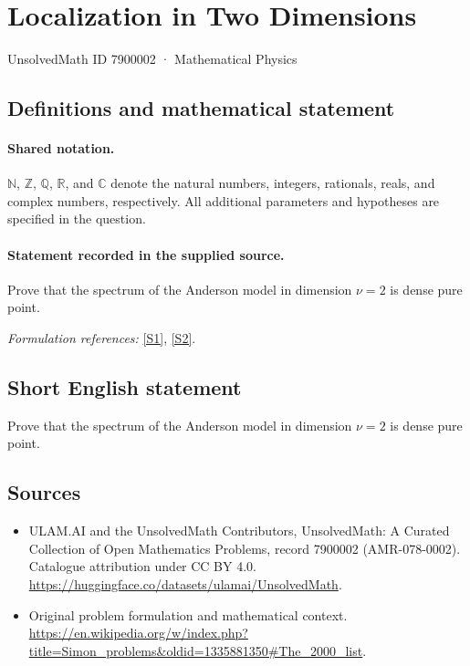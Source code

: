 \documentclass[11pt]{article}
\newcommand{\sref}[2]{\hyperlink{source:#1:#2}{[S#2]}}
\begin{document}
\setcounter{section}{7900001}
\section{Localization in Two Dimensions}\label{7900002}
{\small UnsolvedMath ID 7900002 · Mathematical Physics}
\subsection{Definitions and mathematical statement}

\paragraph{Shared notation.}$\mathbb N$, $\mathbb Z$, $\mathbb Q$, $\mathbb R$, and $\mathbb C$ denote the natural numbers, integers, rationals, reals, and complex numbers, respectively. All additional parameters and hypotheses are specified in the question.


\paragraph{Statement recorded in the supplied source.}
Prove that the spectrum of the Anderson model in dimension $\nu=2$ is dense pure point.
\par\smallskip\textit{Formulation references:} \sref{7900002}{1}, \sref{7900002}{2}.
\subsection{Short English statement}
Prove that the spectrum of the Anderson model in dimension $\nu=2$ is dense pure point.
\subsection{Sources}
\begin{itemize}
\item[\hypertarget{source:7900002:1}{S1}] ULAM.AI and the UnsolvedMath Contributors, UnsolvedMath: A Curated Collection of Open Mathematics Problems, record 7900002 (AMR-078-0002). Catalogue attribution under CC BY 4.0.
\url{https://huggingface.co/datasets/ulamai/UnsolvedMath}.
\item[\hypertarget{source:7900002:2}{S2}] Original problem formulation and mathematical context.
\url{https://en.wikipedia.org/w/index.php?title=Simon_problems&oldid=1335881350#The_2000_list}.
\end{itemize}
\label{end:7900002}
\end{document}
